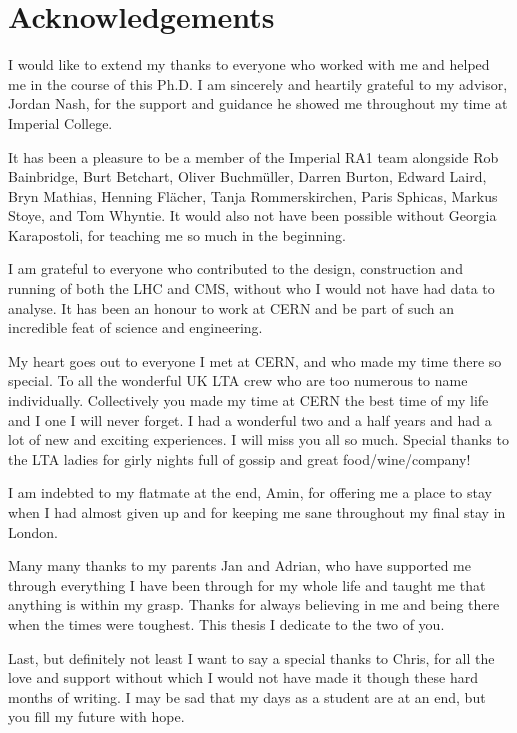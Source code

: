 \chapter*{Acknowledgements}


\normalsize

I would like to extend my thanks to everyone who worked with me and helped me in the course of this Ph.D. I am sincerely and heartily grateful to my advisor, Jordan Nash, for the support and guidance he showed me throughout my time at Imperial College.

It has been a pleasure to be a member of the Imperial RA1 team alongside Rob Bainbridge, Burt Betchart, Oliver Buchm\"uller, Darren Burton, Edward Laird, Bryn Mathias, Henning Fl\"acher, Tanja Rommerskirchen, Paris Sphicas, Markus Stoye, and Tom Whyntie. It would also not have been possible without Georgia Karapostoli, for teaching me so much in the beginning. 

I am grateful to everyone who contributed to the design, construction and running of both the LHC and CMS, without who I would not have had data to analyse. It has been an honour to work at CERN and be part of such an incredible feat of science and engineering.

My heart goes out to everyone I met at CERN, and who made my time there so special. To all the wonderful UK LTA crew who are too numerous to name individually. Collectively you made my time at CERN the best time of my life and I one I will never forget. I had a wonderful two and a half years and had a lot of new and exciting experiences. I will miss you all so much. Special thanks to the LTA ladies for girly nights full of gossip and great food/wine/company! 

I am indebted to my flatmate at the end, Amin, for offering me a place to stay when I had almost given up and for keeping me sane throughout my final stay in London. 

Many many thanks to my parents Jan and Adrian, who have supported me through everything I have been through for my whole life and taught me that anything is within my grasp.
Thanks for always believing in me and being there when the times were toughest. This thesis I dedicate to the two of you. 

Last, but definitely not least I want to say a special thanks to Chris, for all the love and support without which I would not have made it though these hard months of writing. I may be sad that my days as a student are at an end, but you fill my future with hope. 

